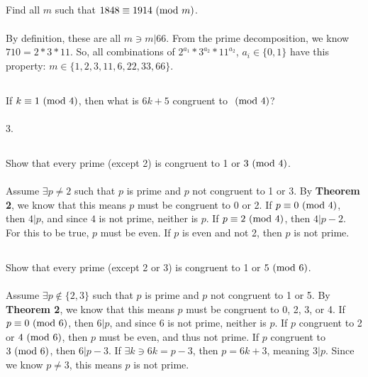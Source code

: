 \documentclass{article}
\begin{document}
\subsection{}
Find all $m$ such that $1848 \equiv 1914 \ (\mathrm{mod}\ m)$.\\~\\
By definition, these are all $m \ni m|66$.
From the prime decomposition, we know $710 = 2 * 3 * 11$.
So, all combinations of $2^{a_1} * 3^{a_2} * 11^{a_2}$, $a_i \in \{0, 1\}$
have this property: $m \in \{1, 2, 3, 11, 6, 22, 33, 66\}$.

\subsection{}
If $k \equiv 1 \ (\mathrm{mod}\ 4)$, then what is $6k + 5$ congruent to $\ (\mathrm{mod}\ 4)$?\\~\\
3.

\subsection{}
Show that every prime (except 2) is congruent to 1 or $3 \ (\mathrm{mod}\ 4)$.\\~\\
Assume $\exists p \neq 2$ such that $p$ is prime and $p$ not congruent to 1 or 3.
By \textbf{Theorem 2}, we know that this means $p$ must be congruent to 0 or 2.
If $p \equiv 0 \ (\mathrm{mod}\ 4)$, then $4|p$, and since $4$ is not prime, neither is $p$.
If $p \equiv 2 \ (\mathrm{mod}\ 4)$, then $4|p - 2$.
For this to be true, $p$ must be even.
If $p$ is even and not 2, then $p$ is not prime.

\subsection{}
Show that every prime (except 2 or 3) is congruent to 1 or $5 \ (\mathrm{mod}\ 6)$.\\~\\
Assume $\exists p \not\in \{2, 3\}$ such that $p$ is prime and $p$ not congruent to 1 or 5.
By \textbf{Theorem 2}, we know that this means $p$ must be congruent to 0, 2, 3, or 4.
If $p \equiv 0 \ (\mathrm{mod}\ 6)$, then $6|p$, and since $6$ is not prime, neither is $p$.
If $p$ congruent to 2 or $4 \ (\mathrm{mod}\ 6)$, then $p$ must be even, and thus not prime.
If $p$ congruent to $3 \ (\mathrm{mod}\ 6)$, then $6|p - 3$.
If $\exists k \ni 6k = p - 3$, then $p = 6k + 3$, meaning $3|p$.
Since we know $p \neq 3$, this means $p$ is not prime.

\end{document}
